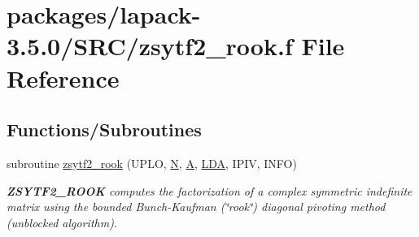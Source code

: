\hypertarget{zsytf2__rook_8f}{}\section{packages/lapack-\/3.5.0/\+S\+R\+C/zsytf2\+\_\+rook.f File Reference}
\label{zsytf2__rook_8f}
\subsection*{Functions/\+Subroutines}
\begin{DoxyCompactItemize}
\item 
subroutine \hyperlink{group__complex16SYcomputational_ga72c010740cd6424c8e5518bd1ef0977c}{zsytf2\+\_\+rook} (U\+P\+L\+O, \hyperlink{polmisc_8c_a0240ac851181b84ac374872dc5434ee4}{N}, \hyperlink{classA}{A}, \hyperlink{example__user_8c_ae946da542ce0db94dced19b2ecefd1aa}{L\+D\+A}, I\+P\+I\+V, I\+N\+F\+O)
\begin{DoxyCompactList}\small\item\em {\bfseries Z\+S\+Y\+T\+F2\+\_\+\+R\+O\+O\+K} computes the factorization of a complex symmetric indefinite matrix using the bounded Bunch-\/\+Kaufman (\char`\"{}rook\char`\"{}) diagonal pivoting method (unblocked algorithm). \end{DoxyCompactList}\end{DoxyCompactItemize}
